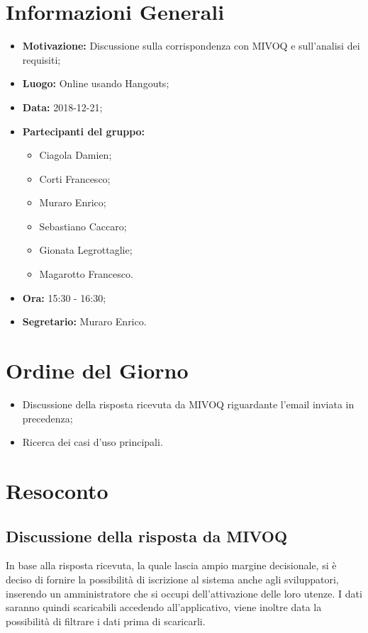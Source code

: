 \documentclass[a4paper, oneside, openany, dvipsnames, table]{article}
\begin{document}
\copertina{}


\newpage
\tableofcontents
\newpage

\section{Informazioni Generali}
\begin{itemize}
\item \textbf{Motivazione:} Discussione sulla corrispondenza con MIVOQ e sull'analisi dei requisiti;
\item \textbf{Luogo:} Online usando Hangouts;
\item \textbf{Data:} 2018-12-21;
\item \textbf{Partecipanti del gruppo:}
	\begin{itemize}
	\item Ciagola Damien;
	\item Corti Francesco;
	\item Muraro Enrico;
	\item Sebastiano Caccaro;
	\item Gionata Legrottaglie;
	\item Magarotto Francesco.
	\end{itemize} 
\item \textbf{Ora:} 15:30 - 16:30;
\item \textbf{Segretario:} Muraro Enrico.
\end{itemize}

\section{Ordine del Giorno}
\begin{itemize}
\item Discussione della risposta ricevuta da MIVOQ riguardante l'email inviata in precedenza;
\item Ricerca dei casi d'uso principali.
\end{itemize}

\section{Resoconto}
\subsection{Discussione della risposta da MIVOQ} In base alla risposta ricevuta, la quale lascia ampio margine decisionale, si è deciso di fornire la possibilità di iscrizione al sistema anche agli sviluppatori, inserendo un amministratore che si occupi dell'attivazione delle loro utenze. I dati saranno quindi scaricabili accedendo all'applicativo, viene inoltre data la possibilità di filtrare i dati prima di scaricarli.
\end{document}
